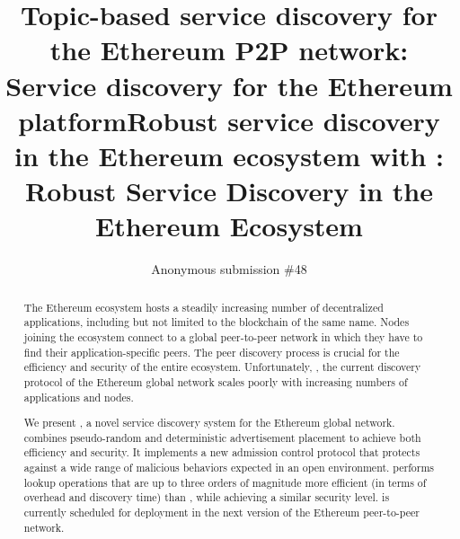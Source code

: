 \documentclass[compsoc, conference, a4paper, 10pt, times]{IEEEtran}
\begin{document}
\title{Topic-based service discovery for the Ethereum P2P network}
\title{\sysname: Service discovery for the Ethereum platform}
\title{Robust service discovery in the Ethereum ecosystem with \sysname}
\title{\sysname: Robust Service Discovery in the Ethereum Ecosystem}
\author{Anonymous submission \#48}
\maketitle
\begin{abstract}

The Ethereum ecosystem hosts a steadily increasing number of decentralized applications, including but not limited to the blockchain of the same name. Nodes joining the ecosystem connect to a global peer-to-peer network in which they have to find their application-specific peers. The peer discovery process is crucial for the efficiency and security of the entire ecosystem. Unfortunately, \discv, the current discovery protocol of the Ethereum global network scales poorly with increasing numbers of applications and nodes.

We present \sysname, a novel service discovery system for the Ethereum global network. \sysname combines pseudo-random and deterministic advertisement placement to achieve both efficiency and security. It implements a new admission control protocol that protects against a wide range of malicious behaviors expected in an open environment. 
\sysname performs lookup operations that are up to three orders of magnitude more efficient (in terms of overhead and discovery time) than \discv, while achieving a similar security level.  \sysname is currently scheduled for deployment in the next version of the Ethereum peer-to-peer network.  

\end{abstract}





















%
\clearpage



\end{document}
